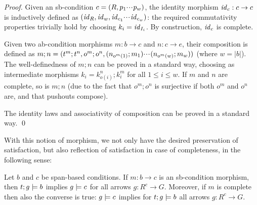 \begin{proof}
  Given an sb-condition $c=(R,p_1{\cdotp\mkern-2mu\cdotp\mkern-2mu\cdotp\mkern1mu} p_w)$, the identity morphism $\mathit{id}_c:c\to c$ is inductively defined as $(\mathit{id}_R,\mathit{id}_w,\mathit{id}_{c_1}{\cdotp\mkern-2mu\cdotp\mkern-2mu\cdotp\mkern1mu} \mathit{id}_{c_w})$: the required commutativity properties trivially hold by choosing $k_i=\mathit{id}_{I_i}$. By construction, $\mathit{id}_c$ is complete.
  
Given two ab-condition morphisms $m:b\to c$ and $n:c\to e$, their composition is defined as $m;n=(t^m;t^n,o^m;o^n,(n_{o^m(1)};m_1){\cdotp\mkern-2mu\cdotp\mkern-2mu\cdotp\mkern1mu} (n_{o^m(w)};m_{w}))$ (where $w=|b|$).
The well-definedness of $m;n$ can be proved in a standard way, choosing as intermediate morphisms $k_i=k^n_{o(i)};k^m_i$ for all $1\leq i\leq w$. If $m$ and $n$ are complete, so is $m;n$ (due to the fact that $o^m;o^n$ is surjective if both $o^m$ and $o^n$ are, and that pushouts compose).

The identity laws and associativity of composition can be proved in a standard way. \qed
\end{proof}
%
With this notion of morphism, we not only have the desired preservation of satisfaction, but also reflection of satisfaction in case of completeness, in the following sense:
%
\begin{proposition}
Let $b$ and $c$ be span-based conditions. If $m:b\to c$ is an sb-condition morphism, then $t;g\models b$ implies $g\models c$ for all arrows $g:R^c\to G$. Moreover, if $m$ is complete then also the converse is true: $g\models c$ implies for $t;g\models b$ all arrows $g:R^c\to G$.
\end{proposition}
%
